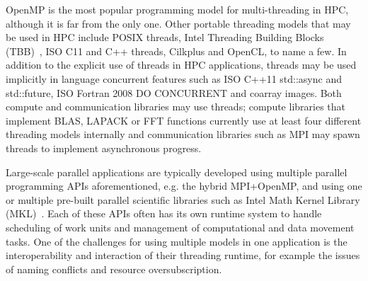 
OpenMP\regtm{} is the most popular programming model for multi-threading in HPC,
although it is far from the only one.
Other portable threading models that may be used in HPC include
POSIX threads,
Intel\regtm{} Threading Building Blocks (TBB)~\cite{pheatt2008intel},
ISO C11 and C++ threads, Cilkplus\tm{} and
OpenCL\tm{}, to name a few. 
In addition to the explicit use of threads in HPC applications,
threads may be used implicitly in language concurrent features such as
ISO C++11 {\sf std::async} and {\sf std::future},
ISO Fortran 2008 {\sf DO CONCURRENT} and coarray images.
Both compute and communication libraries may use threads;
compute libraries that implement BLAS, LAPACK or FFT functions
currently use at least four different threading models internally and
communication libraries such as MPI may spawn threads to implement asynchronous progress.

Large-scale parallel applications are typically developed using multiple parallel programming APIs 
aforementioned, e.g. the hybrid MPI+OpenMP, and using one or multiple pre-built parallel scientific
libraries such as Intel Math Kernel Library (MKL)~\cite{wang2014intel}.
Each of these APIs often has its own runtime system to handle scheduling of work units 
and management of computational and data movement tasks. 
One of the challenges for using multiple models in one application is the interoperability and
interaction of their threading runtime, for example the issues of naming conflicts and resource
oversubscription. 

